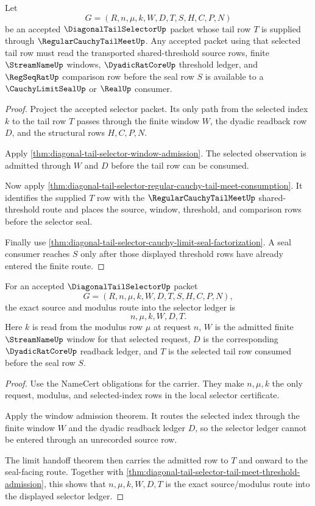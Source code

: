 \begin{theorem}
\label{thm:diagonal-tail-selector-tail-meet-threshold-admission}
Let
$$
G=(R,n,\mu,k,W,D,T,S,H,C,P,N)
$$
be an accepted $\DiagonalTailSelectorUp$ packet whose tail row $T$ is supplied
through $\RegularCauchyTailMeetUp$. Any accepted packet using that selected
tail row must read the transported shared-threshold source rows, finite
$\StreamNameUp$ windows, $\DyadicRatCoreUp$ threshold ledger, and
$\RegSeqRatUp$ comparison row before the seal row $S$ is available to a
$\CauchyLimitSealUp$ or $\RealUp$ consumer.
\end{theorem}
\begin{proof}
Project the accepted selector packet. Its only path from the selected index
$k$ to the tail row $T$ passes through the finite window $W$, the dyadic
readback row $D$, and the structural rows $H,C,P,N$.

Apply \autoref{thm:diagonal-tail-selector-window-admission}. The selected
observation is admitted through $W$ and $D$ before the tail row can be
consumed.

Now apply
\autoref{thm:diagonal-tail-selector-regular-cauchy-tail-meet-consumption}.
It identifies the supplied $T$ row with the
$\RegularCauchyTailMeetUp$ shared-threshold route and places the source,
window, threshold, and comparison rows before the selector seal.

Finally use
\autoref{thm:diagonal-tail-selector-cauchy-limit-seal-factorization}. A seal
consumer reaches $S$ only after those displayed threshold rows have already
entered the finite route.
\end{proof}

\begin{theorem}
\label{thm:diagonal-tail-selector-source-modulus-route-exactness}
For an accepted $\DiagonalTailSelectorUp$ packet
$$
G=(R,n,\mu,k,W,D,T,S,H,C,P,N),
$$
the exact source and modulus route into the selector ledger is
$$
n,\mu,k,W,D,T.
$$
Here $k$ is read from the modulus row $\mu$ at request $n$, $W$ is the
admitted finite $\StreamNameUp$ window for that selected request, $D$ is the
corresponding $\DyadicRatCoreUp$ readback ledger, and $T$ is the selected
tail row consumed before the seal row $S$.
\end{theorem}
\begin{proof}
Use the NameCert obligations for the carrier. They make $n,\mu,k$ the only
request, modulus, and selected-index rows in the local selector certificate.

Apply the window admission theorem. It routes the selected index through the
finite window $W$ and the dyadic readback ledger $D$, so the selector ledger
cannot be entered through an unrecorded source row.

The limit handoff theorem then carries the admitted row to $T$ and onward to
the seal-facing route. Together with
\autoref{thm:diagonal-tail-selector-tail-meet-threshold-admission}, this
shows that $n,\mu,k,W,D,T$ is the exact source/modulus route into the
displayed selector ledger.
\end{proof}

